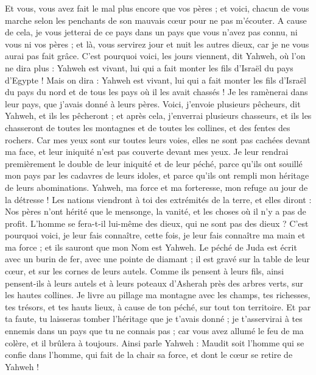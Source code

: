 \begin{multicols}{2}
Et vous, vous avez fait le mal plus encore que vos pères ; et voici, chacun de vous marche selon les penchants de son mauvais cœur pour ne pas m'écouter.
A cause de cela, je vous jetterai de ce pays dans un pays que vous n'avez pas connu, ni vous ni vos pères ; et là, vous servirez jour et nuit les autres dieux, car je ne vous aurai pas fait grâce.
C'est pourquoi voici, les jours viennent, dit Yahweh, où l'on ne dira plus : Yahweh est vivant, lui qui a fait monter les fils d'Israël du pays d'Egypte !
Mais on dira : Yahweh est vivant, lui qui a fait monter les fils d'Israël du pays du nord et de tous les pays où il les avait chassés ! Je les ramènerai dans leur pays, que j'avais donné à leurs pères.
Voici, j'envoie plusieurs pêcheurs, dit Yahweh, et ils les pêcheront ; et après cela, j'enverrai plusieurs chasseurs, et ils les chasseront de toutes les montagnes et de toutes les collines, et des fentes des rochers.
Car mes yeux sont sur toutes leurs voies, elles ne sont pas cachées devant ma face, et leur iniquité n'est pas couverte devant mes yeux.
Je leur rendrai premièrement le double de leur iniquité et de leur péché, parce qu'ils ont souillé mon pays par les cadavres de leurs idoles, et parce qu'ils ont rempli mon héritage de leurs abominations.
Yahweh, ma force et ma forteresse, mon refuge au jour de la détresse ! Les nations viendront à toi des extrémités de la terre, et elles diront : Nos pères n'ont hérité que le mensonge, la vanité, et les choses où il n'y a pas de profit.
L'homme se fera-t-il lui-même des dieux, qui ne sont pas des dieux ?
C'est pourquoi voici, je leur fais connaître, cette fois, je leur fais connaître ma main et ma force ; et ils sauront que mon Nom est Yahweh.
\VerseOne{}Le péché de Juda est écrit avec un burin de fer, avec une pointe de diamant ; il est gravé sur la table de leur cœur, et sur les cornes de leurs autels.
Comme ils pensent à leurs fils, ainsi pensent-ils à leurs autels et à leurs poteaux d'Asherah près des arbres verts, sur les hautes collines.
Je livre au pillage ma montagne avec les champs, tes richesses, tes trésors, et tes hauts lieux, à cause de ton péché, sur tout ton territoire.
Et par ta faute, tu laisseras tomber l'héritage que je t'avais donné ; je t'asservirai à tes ennemis dans un pays que tu ne connais pas ; car vous avez allumé le feu de ma colère, et il brûlera à toujours.
Ainsi parle Yahweh : Maudit soit l'homme qui se confie dans l'homme, qui fait de la chair sa force, et dont le cœur se retire de Yahweh !

\end{multicols}
